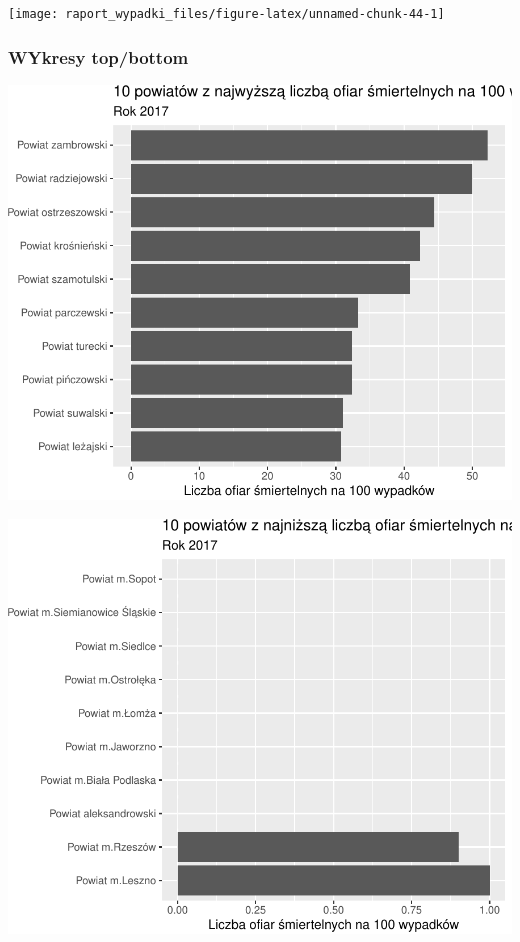 \documentclass[
]{article}
\begin{document}
\begin{flushleft}\texttt{[image: raport\_wypadki\_files/figure-latex/unnamed-chunk-44-1]} \end{flushleft}

\hypertarget{wykresy-topbottom-2}{%
\subsubsection{WYkresy top/bottom}\label{wykresy-topbottom-2}}

\begin{flushleft}\includegraphics{raport_wypadki_files/figure-latex/unnamed-chunk-45-1} \end{flushleft}

\begin{flushleft}\includegraphics{raport_wypadki_files/figure-latex/unnamed-chunk-46-1} \end{flushleft}
\end{document}

